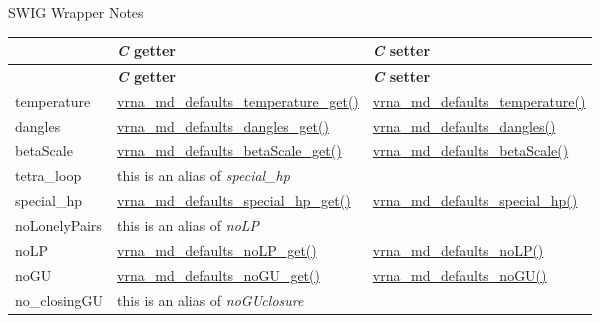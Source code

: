 \begin{DoxyRefDesc}{S\+W\+I\+G Wrapper Notes}
\tabulinesep=1mm
\begin{longtabu} spread 0pt [c]{*3{|X[-1]}|}
\hline
{}&{\bf {\itshape C} getter }&{\bf {\itshape C} setter  }\\
\endfirsthead
\hline
\endfoot
\hline
{}&{\bf {\itshape C} getter }&{\bf {\itshape C} setter  }\\
\endhead
temperature &\hyperlink{group__model__details_ga96b24a74437f9ba46c4e06343155bf46}{vrna\+\_\+md\+\_\+defaults\+\_\+temperature\+\_\+get()} &\hyperlink{group__model__details_gaf9e527e9a2f7e6fd6e42bc6e602f5445}{vrna\+\_\+md\+\_\+defaults\+\_\+temperature()} \\
dangles &\hyperlink{group__model__details_ga67ca06f95ae133778c79a4493c9817b8}{vrna\+\_\+md\+\_\+defaults\+\_\+dangles\+\_\+get()} &\hyperlink{group__model__details_gac76a5374def8e5e4e644ff6e4cc72dee}{vrna\+\_\+md\+\_\+defaults\+\_\+dangles()} \\
beta\+Scale &\hyperlink{group__model__details_gabb8780f5410c52f970d75b044059bd09}{vrna\+\_\+md\+\_\+defaults\+\_\+beta\+Scale\+\_\+get()} &\hyperlink{group__model__details_gae984567db36c3f9b8731ecc917abf3a2}{vrna\+\_\+md\+\_\+defaults\+\_\+beta\+Scale()} \\
tetra\+\_\+loop &this is an alias of {\itshape special\+\_\+hp} &\\
special\+\_\+hp &\hyperlink{group__model__details_ga1d68a6efdaa1253cc63fd9cd06452559}{vrna\+\_\+md\+\_\+defaults\+\_\+special\+\_\+hp\+\_\+get()} &\hyperlink{group__model__details_gafff6449a02744add0308e653230c15fc}{vrna\+\_\+md\+\_\+defaults\+\_\+special\+\_\+hp()} \\
no\+Lonely\+Pairs &this is an alias of {\itshape no\+LP} &\\
no\+LP &\hyperlink{group__model__details_ga934344888fbacaed538bbbfe910f2aa6}{vrna\+\_\+md\+\_\+defaults\+\_\+no\+L\+P\+\_\+get()} &\hyperlink{group__model__details_ga2f88ffc393ac9d7987849c965fd29ea8}{vrna\+\_\+md\+\_\+defaults\+\_\+no\+L\+P()} \\
no\+GU &\hyperlink{group__model__details_ga5faa7d4e536d7fe36ec25428c0cf2563}{vrna\+\_\+md\+\_\+defaults\+\_\+no\+G\+U\+\_\+get()} &\hyperlink{group__model__details_ga98218f85c7a957a1d1ddf4627fdf5a39}{vrna\+\_\+md\+\_\+defaults\+\_\+no\+G\+U()} \\
no\+\_\+closing\+GU &this is an alias of {\itshape no\+G\+Uclosure} &\\

\end{longtabu}
\end{DoxyRefDesc}
